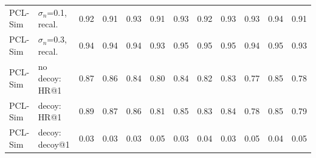 \begin{table}[t]
{\begin{tabular}{@{}llcccccccccc@{}}
PCL-Sim & $\sigma_n$=0.1, recal. & 0.92 & 0.91 & 0.93 & 0.91 & 0.93 & 0.92 & 0.93 & 0.93 & 0.94 & 0.91\\
PCL-Sim & $\sigma_n$=0.3, recal. & 0.94 & 0.94 & 0.94 & 0.93 & 0.95 & 0.95 & 0.95 & 0.94 & 0.95 & 0.93\\
\midrule
PCL-Sim & no decoy: HR@1 & 0.87 & 0.86 & 0.84 & 0.80 & 0.84 & 0.82 & 0.83 & 0.77 & 0.85 & 0.78\\
PCL-Sim & decoy: HR@1 & 0.89 & 0.87 & 0.86 & 0.81 & 0.85 & 0.83 & 0.84 & 0.78 & 0.85 & 0.79\\
PCL-Sim & decoy: decoy@1 & 0.03 & 0.03 & 0.03 & 0.05 & 0.03 & 0.04 & 0.03 & 0.05 & 0.04 & 0.05\\
\bottomrule
\end{tabular}}
\end{table}
